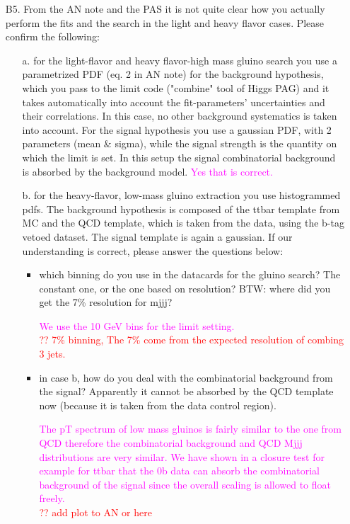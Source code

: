 \documentclass[paper=a4, fontsize=11pt]{scrartcl}
\begin{document}
\begin{itemize}
\item[B5.] From the AN note and the PAS it is not quite clear how you actually perform the fits
and the search in the light and heavy flavor cases. Please confirm the following: 
\begin{itemize}
\item[a.] for the light-flavor and heavy flavor-high mass gluino search you use a parametrized PDF (eq. 2 in AN note) for the background hypothesis, which you pass to the limit code ("combine" tool of Higgs PAG) and it takes automatically into account the fit-parameters' uncertainties and their correlations. In this case, no other background systematics is taken into account. For the signal hypothesis you use a gaussian PDF, with 2 parameters (mean \& sigma), while the signal strength is the quantity on which the limit is set. In this setup the signal combinatorial background is absorbed by the background model.
\textcolor{magenta}{Yes that is correct.}\\
\item[b.] for the heavy-flavor, low-mass gluino extraction you use histogrammed pdfs. The background hypothesis is composed of the ttbar template from MC and the QCD template, which is taken from the data, using the b-tag vetoed dataset. The signal template is again a gaussian.
If our understanding is correct, please answer the questions below: 
\begin{itemize}
\item which binning do you use in the datacards for the gluino search? The constant one, or the one based on resolution? BTW: where did you get the 7\% resolution for mjjj? 

\textcolor{magenta}{We use the 10 GeV bins for the limit setting.}\\
\textcolor{red}{?? 7\% binning, The 7\% come from the expected resolution of combing 3 jets.}\\

\item in case b, how do you deal with the combinatorial background from the signal? Apparently it cannot be absorbed by the QCD template now (because it is taken from the data control region). 

\textcolor{magenta}{The pT spectrum of low mass gluinos is fairly similar to the one from QCD therefore the combinatorial background and QCD
Mjjj distributions are very similar. We have shown in a closure test for example for ttbar that the 0b data can absorb the combinatorial background of the signal since the overall scaling is allowed to float freely.}\\
\textcolor{red}{?? add plot to AN or here}


\end{itemize}
\end{itemize}
\end{itemize}
\end{document}
